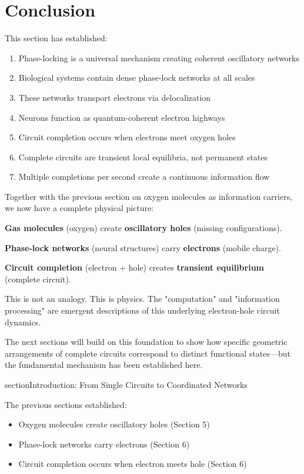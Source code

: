 \documentclass[12pt,a4paper]{article}
\begin{document}
\section{Conclusion}

This section has established:
\begin{enumerate}
\item Phase-locking is a universal mechanism creating coherent oscillatory networks
\item Biological systems contain dense phase-lock networks at all scales
\item These networks transport electrons via delocalization
\item Neurons function as quantum-coherent electron highways
\item Circuit completion occurs when electrons meet oxygen holes
\item Complete circuits are transient local equilibria, not permanent states
\item Multiple completions per second create a continuous information flow
\end{enumerate}

Together with the previous section on oxygen molecules as information carriers, we now have a complete physical picture:

\textbf{Gas molecules} (oxygen) create \textbf{oscillatory holes} (missing configurations).

\textbf{Phase-lock networks} (neural structures) carry \textbf{electrons} (mobile charge).

\textbf{Circuit completion} (electron + hole) creates \textbf{transient equilibrium} (complete circuit).

This is not an analogy. This is physics. The "computation" and "information processing" are emergent descriptions of this underlying electron-hole circuit dynamics.

The next sections will build on this foundation to show how specific geometric arrangements of complete circuits correspond to distinct functional states—but the fundamental mechanism has been established here.

section{Introduction: From Single Circuits to Coordinated Networks}

The previous sections established:
\begin{itemize}
\item Oxygen molecules create oscillatory holes (Section 5)
\item Phase-lock networks carry electrons (Section 6)
\item Circuit completion occurs when electron meets hole (Section 6)
\end{itemize}
\end{document}
